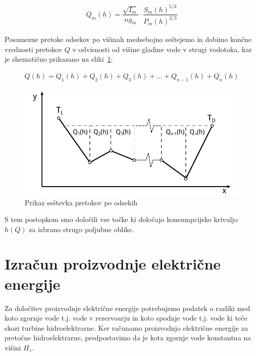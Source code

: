 \begin{ceqn}
	\begin{align}
	Q_m(h) = \dfrac{\sqrt{I_m}}{ng_m} \cdot \dfrac{S_m(h)^{5/3}}{P_m(h)^{2/3}}
	\end{align}
\end{ceqn}


Posamezne pretoke odsekov po višinah medsebojno seštejemo in dobimo končne vrednosti pretokov $Q$ v odvisnosti od višine gladine vode v strugi vodotoka, kar je shematično prikazano na sliki~\ref{fig:customChannel_sestevek}:

\begin{ceqn}
	\begin{align}
	Q(h) = Q_1(h) + Q_2(h) + Q_3(h) + ... + Q_{n-1}(h) + Q_n(h)
	\end{align}
\end{ceqn}


\begin{figure}[ht!]
	\begin{centering}
		\includegraphics{slike/customChannel/sestevekPretokov.pdf}
		\caption{Prikaz seštevka pretokov po odsekih}\label{fig:customChannel_sestevek}
	\end{centering}
\end{figure}



S tem postopkom smo določili vse točke ki določajo konsumpcijsko krivuljo $h(Q)$ za izbrano strugo poljubne oblike.


\newpage

\section{Izračun proizvodnje električne energije}
Za določitev proizvodnje električne energije potrebujemo podatek o razliki med koto zgornje vode t.j. vode v rezervoarju in koto spodnje vode t.j. vode ki teče skozi turbine hidroelektrarne. Ker računamo proizvodnjo električne energije za pretočne hidroelektrarne, predpostavimo da je kota zgornje vode konstantna na višini $H_z$.

